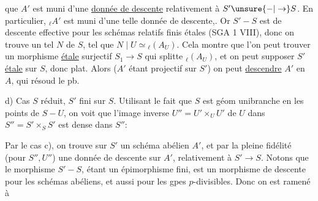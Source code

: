 que $A'$ est muni d'une \uline{donnée de descente} relativement à $S'\unsure{-|\to}S$. En particulier,  $ {}_{\ell}A'$ est muni d'une telle donnée de descente,.   Or $S'-S$ est  de descente effective pour les schémas relatifs finis étales (SGA 1 VIII), donc on trouve un  tel    $N$ de $S$, tel que $N\mid U\simeq{}_{\ell}(A_U)$. Cela montre que l'on peut trouver un morphisme  \uline{étale} surjectif $S_1\to S$ qui splitte $ {}_{\ell}(A_U)$,  et on peut supposer $S'$  \uline{étale} sur $S$, donc plat. Alors ($A'$ étant projectif sur $S'$) on  peut \uline{descendre} $A'$ en $A$, qui résoud le pb.

d) Cas $S$ réduit,  $S'$ fini sur $S$. Utilisant le fait que $S$ est géom unibranche en les points de $S-U$, on voit que l'image inverse $U''=U'\times_U U'$ de $U$ dans $S''=S'\times_S S'$ est dense dans $S''$: 


Par le cas c), on trouve sur $S'$ un schéma abélien $A'$, et par la pleine fidélité (pour $S'',U''$) une donnée de descente sur $A'$, relativement à $S'\to S$. Notons que le morphisme $S'-S$, étant un épimorphisme fini, est un morphisme de descente pour les schémas abéliens,  et aussi pour les gpes $p$-divisibles. Donc on est ramené à
